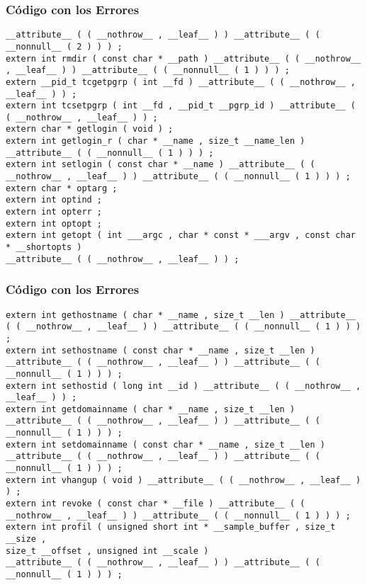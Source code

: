 \documentclass{beamer}
\begin{document}
\begin{frame}[fragile]
\frametitle{C\'odigo con los Errores}
\begin{lstlisting}[style=CStyle]
__attribute__ ( ( __nothrow__ , __leaf__ ) ) __attribute__ ( ( __nonnull__ ( 2 ) ) ) ; 
extern int rmdir ( const char * __path ) __attribute__ ( ( __nothrow__ , __leaf__ ) ) __attribute__ ( ( __nonnull__ ( 1 ) ) ) ; 
extern __pid_t tcgetpgrp ( int __fd ) __attribute__ ( ( __nothrow__ , __leaf__ ) ) ; 
extern int tcsetpgrp ( int __fd , __pid_t __pgrp_id ) __attribute__ ( ( __nothrow__ , __leaf__ ) ) ; 
extern char * getlogin ( void ) ; 
extern int getlogin_r ( char * __name , size_t __name_len ) __attribute__ ( ( __nonnull__ ( 1 ) ) ) ; 
extern int setlogin ( const char * __name ) __attribute__ ( ( __nothrow__ , __leaf__ ) ) __attribute__ ( ( __nonnull__ ( 1 ) ) ) ; 
extern char * optarg ; 
extern int optind ; 
extern int opterr ; 
extern int optopt ; 
extern int getopt ( int ___argc , char * const * ___argv , const char * __shortopts ) 
__attribute__ ( ( __nothrow__ , __leaf__ ) ) ; 
\end{lstlisting}
\end{frame}
\begin{frame}[fragile]
\frametitle{C\'odigo con los Errores}
\begin{lstlisting}[style=CStyle]
extern int gethostname ( char * __name , size_t __len ) __attribute__ ( ( __nothrow__ , __leaf__ ) ) __attribute__ ( ( __nonnull__ ( 1 ) ) ) ; 
extern int sethostname ( const char * __name , size_t __len ) 
__attribute__ ( ( __nothrow__ , __leaf__ ) ) __attribute__ ( ( __nonnull__ ( 1 ) ) ) ; 
extern int sethostid ( long int __id ) __attribute__ ( ( __nothrow__ , __leaf__ ) ) ; 
extern int getdomainname ( char * __name , size_t __len ) 
__attribute__ ( ( __nothrow__ , __leaf__ ) ) __attribute__ ( ( __nonnull__ ( 1 ) ) ) ; 
extern int setdomainname ( const char * __name , size_t __len ) 
__attribute__ ( ( __nothrow__ , __leaf__ ) ) __attribute__ ( ( __nonnull__ ( 1 ) ) ) ; 
extern int vhangup ( void ) __attribute__ ( ( __nothrow__ , __leaf__ ) ) ; 
extern int revoke ( const char * __file ) __attribute__ ( ( __nothrow__ , __leaf__ ) ) __attribute__ ( ( __nonnull__ ( 1 ) ) ) ; 
extern int profil ( unsigned short int * __sample_buffer , size_t __size , 
size_t __offset , unsigned int __scale ) 
__attribute__ ( ( __nothrow__ , __leaf__ ) ) __attribute__ ( ( __nonnull__ ( 1 ) ) ) ; 
\end{lstlisting}
\end{frame}
\end{document}
